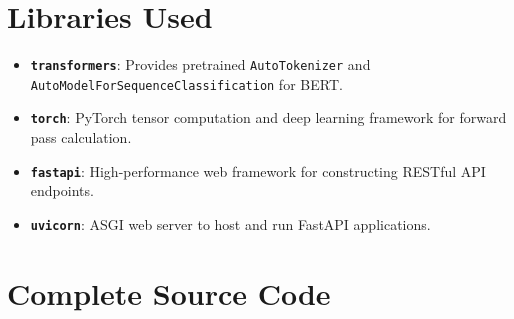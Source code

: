 \documentclass[12pt,a4paper]{article}
\begin{document}
\section{Libraries Used}
\begin{itemize}
    \item \textbf{\texttt{transformers}}: Provides pretrained \texttt{AutoTokenizer} and \texttt{AutoModelForSequenceClassification} for BERT.
    \item \textbf{\texttt{torch}}: PyTorch tensor computation and deep learning framework for forward pass calculation.
    \item \textbf{\texttt{fastapi}}: High-performance web framework for constructing RESTful API endpoints.
    \item \textbf{\texttt{uvicorn}}: ASGI web server to host and run FastAPI applications.
\end{itemize}

\section{Complete Source Code}
\end{document}
